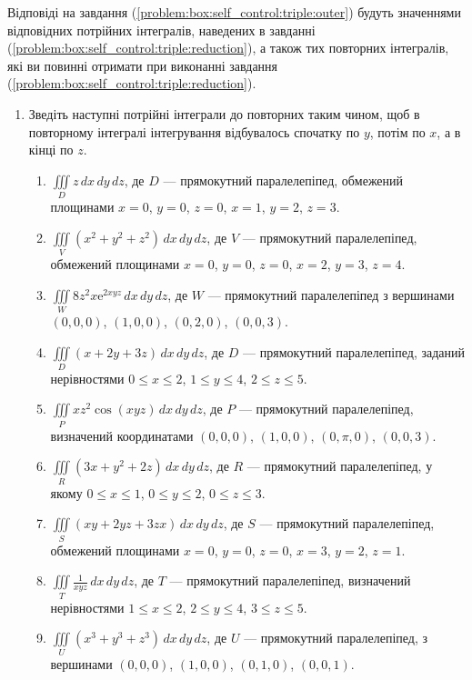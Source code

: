Відповіді на завдання (\ref{problem:box:self_control:triple:outer}) будуть значеннями відповідних потрійних інтегралів, наведених в завданні (\ref{problem:box:self_control:triple:reduction}), а також тих повторних інтегралів, які ви повинні отримати при виконанні завдання (\ref{problem:box:self_control:triple:reduction}).
\begin{enumerate}
\item\label{problem:box:self_control:triple:reduction} Зведіть наступні потрійні інтеграли до повторних таким чином, щоб в повторному інтегралі інтегрування відбувалось спочатку по $y$, потім по $x$, а в кінці по $z$.
    \begin{enumerate}[label*=\arabic*.]
        \item $\iiint\limits_D z \,dx\,dy\,dz$, де $D$ --- прямокутний паралелепіпед, обмежений площинами $x = 0$, $y = 0$, $z = 0$, $x = 1$, $y = 2$, $z = 3$.
        \item  $\iiint\limits_{V} \left(x^2 + y^2 + z^2\right) \, dx \, dy \, dz$, де $V$ --- прямокутний паралелепіпед, обмежений площинами $x = 0$, $y = 0$, $z = 0$, $x = 2$, $y = 3$, $z = 4$.
        \item $\iiint\limits_{W} 8 z^{2} x {\mathrm e}^{2 x y z} \, dx \, dy \, dz$, де $W$ --- прямокутний паралелепіпед з вершинами $(0,0,0)$, $(1,0,0)$, $(0,2,0)$, $(0,0,3)$.
        \item $\iiint\limits_{D} \left(x + 2y + 3z\right) \, dx \, dy \, dz$, де $D$ --- прямокутний паралелепіпед, заданий нерівностями $0 \leq x \leq 2$, $1 \leq y \leq 4$, $2 \leq z \leq 5$.
        \item  $\iiint\limits_{P} x z^{2} \cos\left(x y z\right) \, dx \, dy \, dz$, де $P$ --- прямокутний паралелепіпед, визначений координатами $(0,0,0)$, $(1,0,0)$, $(0,\pi,0)$, $(0,0,3)$.
        \item $\iiint\limits_{R} \left(3x + y^2 + 2z\right) \, dx \, dy \, dz$, де $R$ --- прямокутний паралелепіпед, у якому $0 \leq x \leq 1$, $0 \leq y \leq 2$, $0 \leq z \leq 3$.
        \item $\iiint\limits_{S} \left(xy + 2yz + 3zx\right) \, dx \, dy \, dz$, де $S$ --- прямокутний паралелепіпед, обмежений площинами $x = 0$, $y = 0$, $z = 0$, $x = 3$, $y = 2$, $z = 1$.
        \item $\iiint\limits_{T} \frac{1}{xyz} \, dx \, dy \, dz$, де $T$ --- прямокутний паралелепіпед, визначений нерівностями $1 \leq x \leq 2$, $2 \leq y \leq 4$, $3 \leq z \leq 5$.
        \item $\iiint\limits_{U} \left(x^3 + y^3 + z^3\right) \, dx \, dy \, dz$, де $U$ --- прямокутний паралелепіпед, з вершинами $(0,0,0)$, $(1,0,0)$, $(0,1,0)$, $(0,0,1)$.

\end{enumerate}
\end{enumerate}
